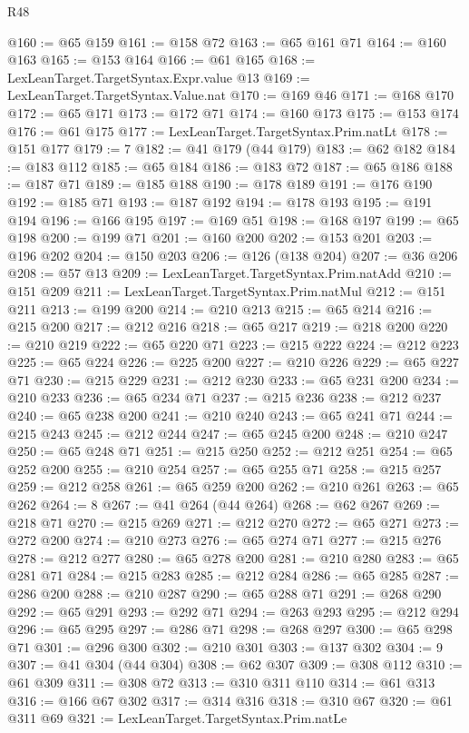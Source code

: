 \begin{lexlean}{R48}
\begin{coremodule}
@160 := @65 @159
@161 := @158 @72
@163 := @65 @161 @71
@164 := @160 @163
@165 := @153 @164
@166 := @61 @165
@168 := LexLeanTarget.TargetSyntax.Expr.value @13
@169 := LexLeanTarget.TargetSyntax.Value.nat
@170 := @169 @46
@171 := @168 @170
@172 := @65 @171
@173 := @172 @71
@174 := @160 @173
@175 := @153 @174
@176 := @61 @175
@177 := LexLeanTarget.TargetSyntax.Prim.natLt
@178 := @151 @177
@179 := 7
@182 := @41 @179 (@44 @179)
@183 := @62 @182
@184 := @183 @112
@185 := @65 @184
@186 := @183 @72
@187 := @65 @186
@188 := @187 @71
@189 := @185 @188
@190 := @178 @189
@191 := @176 @190
@192 := @185 @71
@193 := @187 @192
@194 := @178 @193
@195 := @191 @194
@196 := @166 @195
@197 := @169 @51
@198 := @168 @197
@199 := @65 @198
@200 := @199 @71
@201 := @160 @200
@202 := @153 @201
@203 := @196 @202
@204 := @150 @203
@206 := @126 (@138 @204)
@207 := @36 @206
@208 := @57 @13
@209 := LexLeanTarget.TargetSyntax.Prim.natAdd
@210 := @151 @209
@211 := LexLeanTarget.TargetSyntax.Prim.natMul
@212 := @151 @211
@213 := @199 @200
@214 := @210 @213
@215 := @65 @214
@216 := @215 @200
@217 := @212 @216
@218 := @65 @217
@219 := @218 @200
@220 := @210 @219
@222 := @65 @220 @71
@223 := @215 @222
@224 := @212 @223
@225 := @65 @224
@226 := @225 @200
@227 := @210 @226
@229 := @65 @227 @71
@230 := @215 @229
@231 := @212 @230
@233 := @65 @231 @200
@234 := @210 @233
@236 := @65 @234 @71
@237 := @215 @236
@238 := @212 @237
@240 := @65 @238 @200
@241 := @210 @240
@243 := @65 @241 @71
@244 := @215 @243
@245 := @212 @244
@247 := @65 @245 @200
@248 := @210 @247
@250 := @65 @248 @71
@251 := @215 @250
@252 := @212 @251
@254 := @65 @252 @200
@255 := @210 @254
@257 := @65 @255 @71
@258 := @215 @257
@259 := @212 @258
@261 := @65 @259 @200
@262 := @210 @261
@263 := @65 @262
@264 := 8
@267 := @41 @264 (@44 @264)
@268 := @62 @267
@269 := @218 @71
@270 := @215 @269
@271 := @212 @270
@272 := @65 @271
@273 := @272 @200
@274 := @210 @273
@276 := @65 @274 @71
@277 := @215 @276
@278 := @212 @277
@280 := @65 @278 @200
@281 := @210 @280
@283 := @65 @281 @71
@284 := @215 @283
@285 := @212 @284
@286 := @65 @285
@287 := @286 @200
@288 := @210 @287
@290 := @65 @288 @71
@291 := @268 @290
@292 := @65 @291
@293 := @292 @71
@294 := @263 @293
@295 := @212 @294
@296 := @65 @295
@297 := @286 @71
@298 := @268 @297
@300 := @65 @298 @71
@301 := @296 @300
@302 := @210 @301
@303 := @137 @302
@304 := 9
@307 := @41 @304 (@44 @304)
@308 := @62 @307
@309 := @308 @112
@310 := @61 @309
@311 := @308 @72
@313 := @310 @311 @110
@314 := @61 @313
@316 := @166 @67 @302
@317 := @314 @316
@318 := @310 @67
@320 := @61 @311 @69
@321 := LexLeanTarget.TargetSyntax.Prim.natLe

\end{coremodule}
\end{lexlean}
